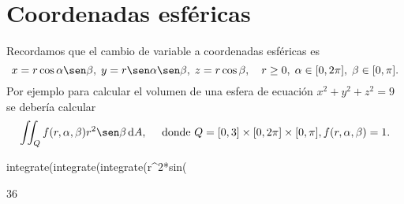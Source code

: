 
\section{Coordenadas esféricas}
Recordamos que el cambio de variable a coordenadas esféricas es
\begin{equation*}
 x=r\cos\alpha\sen\beta,
 \;
 y=r\sen\alpha\sen\beta,
 \;
 z=r\cos\beta,
 \quad
 r\geq0,
 \;
 \alpha\in[0,2\pi],
 \;
 \beta\in[0,\pi].
\end{equation*}
Por ejemplo para calcular el volumen de una esfera de
ecuación $x^2+y^2+z^2 = 9$
se debería calcular
\begin{equation*}
 \iint_{Q} f(r,\alpha,\beta)r^2\sen\beta\,\mathrm{d}A,
 \quad
 \text{ donde }
 Q = [0,3]\times[0,2\pi]\times[0,\pi],
 f(r,\alpha,\beta) = 1.
\end{equation*}
\begin{maximai}
 integrate(integrate(integrate(r^2*sin(%
\end{maximai}\begin{maximao}
 36\pi
\end{maximao}
